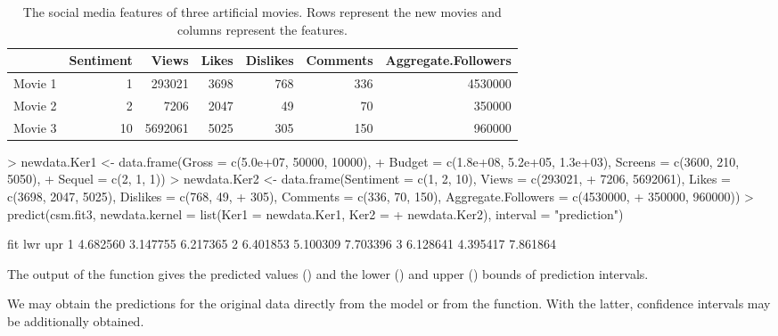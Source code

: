 \begin{table}[htbp]
\centering
\begin{tabular}{rrrrrrr}
\toprule
& Sentiment &  Views & Likes & Dislikes & Comments  & Aggregate.Followers \\
\midrule
Movie 1 &  1 & 293021 & 3698 & 768  &     336   &           4530000 \\
Movie 2 &  2 &  7206 &  2047 &    49    &    70        &       350000 \\
Movie 3 &  10 & 5692061 &  5025 & 305  &     150         &      960000 \\
 \bottomrule
\end{tabular}
\caption{\label{table:csm-predict2} The social media features of three artificial movies. Rows represent the new movies and columns represent the features.}
\end{table}



\begin{example}
> newdata.Ker1 <- data.frame(Gross = c(5.0e+07, 50000, 10000), 
+    Budget = c(1.8e+08, 5.2e+05, 1.3e+03), Screens = c(3600, 210, 5050), 
+    Sequel = c(2, 1, 1))
> newdata.Ker2 <- data.frame(Sentiment = c(1, 2, 10), Views = c(293021,
+    7206, 5692061), Likes = c(3698, 2047, 5025), Dislikes = c(768, 49,
+    305), Comments = c(336, 70, 150), Aggregate.Followers = c(4530000,
+    350000, 960000))
> predict(csm.fit3, newdata.kernel = list(Ker1 = newdata.Ker1, Ker2 =
+    newdata.Ker2), interval = "prediction")
\end{example}
\begin{example}
       fit      lwr      upr
1 4.682560 3.147755 6.217365
2 6.401853 5.100309 7.703396
3 6.128641 4.395417 7.861864
\end{example}


The output of the  function gives the predicted values () and the lower () and upper () bounds of prediction intervals.

We may obtain the predictions for the original data directly from the model or from the  function. With the latter, confidence intervals may be additionally obtained.




